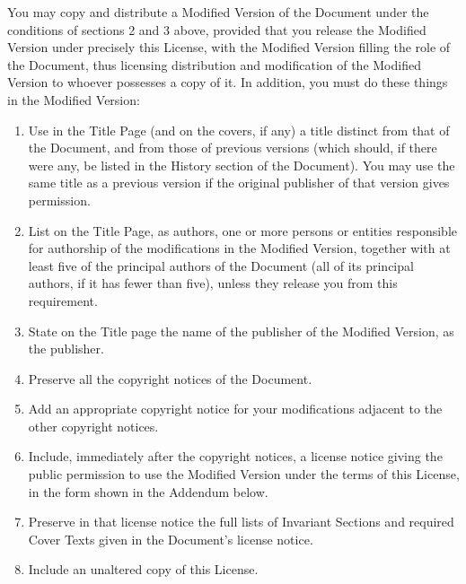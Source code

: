 \documentclass[letterpaper,10pt,english,openany,oneside]{sphinxmanual}
\begin{document}
\sphinxAtStartPar
You may copy and distribute a Modified Version of the Document under the
conditions of sections 2 and 3 above, provided that you release the
Modified Version under precisely this License, with the Modified Version
filling the role of the Document, thus licensing distribution and
modification of the Modified Version to whoever possesses a copy of it.
In addition, you must do these things in the Modified Version:
\begin{enumerate}
%
\item {} 
\sphinxAtStartPar
Use in the Title Page (and on the covers, if any) a title distinct
from that of the Document, and from those of previous versions (which
should, if there were any, be listed in the History section of the
Document). You may use the same title as a previous version if the
original publisher of that version gives permission.

\item {} 
\sphinxAtStartPar
List on the Title Page, as authors, one or more persons or entities
responsible for authorship of the modifications in the Modified
Version, together with at least five of the principal authors of the
Document (all of its principal authors, if it has fewer than five),
unless they release you from this requirement.

\item {} 
\sphinxAtStartPar
State on the Title page the name of the publisher of the Modified
Version, as the publisher.

\item {} 
\sphinxAtStartPar
Preserve all the copyright notices of the Document.

\item {} 
\sphinxAtStartPar
Add an appropriate copyright notice for your modifications adjacent
to the other copyright notices.

\item {} 
\sphinxAtStartPar
Include, immediately after the copyright notices, a license notice
giving the public permission to use the Modified Version under the
terms of this License, in the form shown in the
Addendum below.

\item {} 
\sphinxAtStartPar
Preserve in that license notice the full lists of Invariant Sections
and required Cover Texts given in the Document’s license notice.

\item {} 
\sphinxAtStartPar
Include an unaltered copy of this License.


\end{enumerate}
\end{document}
